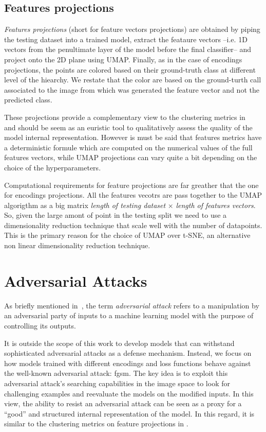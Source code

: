 \subsection{Features projections}
\label{subsec:features-projections}

\emph{Features projections} (short for feature vectors projections) are obtained by piping the testing dataset into a trained model, extract the feataure vectors --i.e. 1D vectors from the penultimate layer of the model before the final classifier-- and project onto the 2D plane using UMAP. Finally, as in the case of encodings projections, the points are colored based on their ground-truth class at different level of the hiearchy. We restate that the color are based on the ground-turth call associated to the image from which was generated the feature vector and not the predicted class.

These projections provide a complementary view to the clustering metrics in~ and should be seem as an euristic tool to qualitatively assess the quality of the model internal representation. However is must be said that features metrics have a deterministic formule which are computed on the numerical values of the full features vectors, while UMAP projections can vary quite a bit depending on the choice of the hyperparameters.

Computational requirements for feature projections are far greather that the one for encodings projections. All the features vecotrs are pass together to the UMAP algorigthm as a big matrix \emph{length of testing dataset} $\times$ \emph{length of features vectors}. So, given the large amont of point in the testing split we need to use a dimensionality reduction technique that scale well with the number of datapoints. This is the primary reason for the choice of UMAP over t-SNE, an alternative non linear dimensionality reduction technique.

\section{Adversarial Attacks}
\label{sec:adversarial-attacks-model-evaluation}

As briefly mentioned in~, the term \emph{adversarial attack} refers to a manipulation by an adversarial party of inputs to a machine learning model with the purpose of controlling its outputs.

It is outside the scope of this work to develop models that can withstand sophisticated adversarial attacks as a defense mechanism. Instead, we focus on how models trained with different encodings and loss functions behave against the well-known adversarial attack: \acrfull{fgsm}. The key idea is to exploit this adversarial attack's searching capabilities in the image space to look for challenging examples and reevaluate the models on the modified inputs. In this view, the ability to resist an adversarial attack can be seen as a proxy for a ``good'' and structured internal representation of the model. In this regard, it is similar to the clustering metrics on feature projections in .

